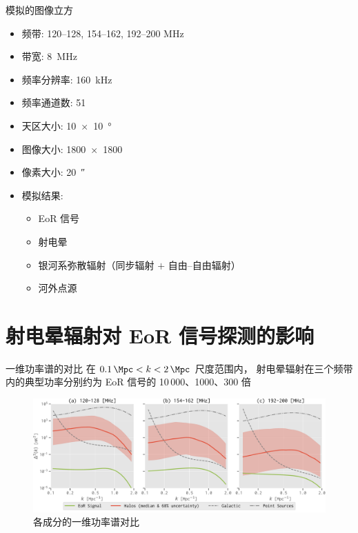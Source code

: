 \documentclass{beamer}
\begin{document}
\begin{frame}{模拟的图像立方}
  \begin{itemize}
    \item 频带: 120--128, 154--162, 192--200 MHz
    \item 带宽: \SI{8}{\MHz}
    \item 频率分辨率: \SI{160}{\kHz}
    \item 频率通道数: 51
    \item 天区大小: \SI{10 x 10}{\degree}
    \item 图像大小: \num{1800 x 1800}
    \item 像素大小: \SI{20}{\arcsecond}
    \item 模拟结果:
      \begin{itemize}
        \item EoR 信号
        \item 射电晕
        \item 银河系弥散辐射（同步辐射 $+$ 自由--自由辐射）
        \item 河外点源
      \end{itemize}
  \end{itemize}
\end{frame}


\section{射电晕辐射对 EoR 信号探测的影响}

\begin{frame}{一维功率谱的对比}
  在 $\SI{0.1}{\per\Mpc} < k < \SI{2}{\per\Mpc}$ 尺度范围内，
  射电晕辐射在三个频带内的典型功率分别约为 EoR 信号的
  10\,000、1000、300 倍

  \begin{figure}
    \centering
    \includegraphics[width=\textwidth]{ps1d-3bands}
    \caption{各成分的一维功率谱对比}
  \end{figure}
\end{frame}
\end{document}
